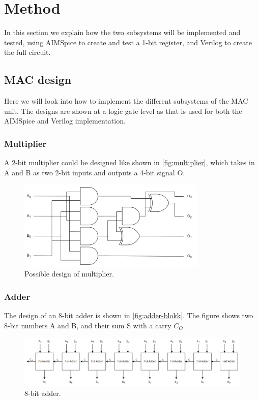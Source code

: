 \section{Method}
\label{sec:method}

In this section we explain how the two subsystems will be implemented and tested, using AIMSpice to create and test a 1-bit register, and Verilog to create the full circuit. 

\subsection{MAC design}
\label{subsec:circuitDesign}

Here we will look into how to implement the different subsystems of the MAC unit. The designs are shown at a logic gate level as that is used for both the AIMSpice and Verilog implementation. 

\subsubsection{Multiplier} 

A 2-bit multiplier could be designed like shown in \autoref{fig:multiplier}, which takes in A and B as two 2-bit inputs and outputs a 4-bit signal O. 

\begin{figure}[H]
    \centering
    \includegraphics[width=0.8\textwidth]{Figures/multiplier.png}
    \caption{Possible design of multiplier.}
    \label{fig:multiplier}
\end{figure}

\subsubsection{Adder}

The design of an 8-bit adder is shown in \autoref{fig:adder-blokk}. The figure shows two 8-bit numbers A and B, and their sum S with a carry $C_O$. 

\begin{figure}[H]
    \centering
    \includegraphics[width=\textwidth]{Figures/8bitadder.png}
    \caption{8-bit adder.}
    \label{fig:adder-blokk}
\end{figure}

